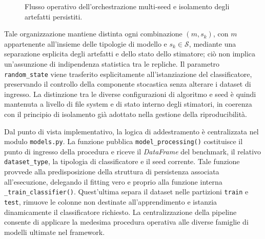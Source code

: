\begin{figure}[H]
\caption{Flusso operativo dell'orchestrazione multi-seed e isolamento degli artefatti persistiti.}
\label{fig:orchestrazione_training}
\end{figure}

Tale organizzazione mantiene distinta ogni combinazione $(m,s_k)$, con $m$ appartenente all'insieme delle tipologie di modello e $s_k \in \mathcal{S}$, mediante una separazione esplicita degli artefatti e dello stato dello stimatore; ciò non implica un'assunzione di indipendenza statistica tra le repliche. 
Il parametro \texttt{random\_state} viene trasferito esplicitamente all'istanziazione del classificatore, preservando il controllo della componente stocastica senza alterare i dataset di ingresso. 
La distinzione tra le diverse configurazioni di algoritmo e seed è quindi mantenuta a livello di file system e di stato interno degli stimatori, in coerenza con il principio di isolamento già adottato nella gestione della riproducibilità.

Dal punto di vista implementativo, la logica di addestramento è centralizzata nel modulo \texttt{models.py}. 
La funzione pubblica \texttt{model\_processing()} costituisce il punto di ingresso della procedura e riceve il \textit{DataFrame} del benchmark, il relativo \texttt{dataset\_type}, la tipologia di classificatore e il seed corrente. 
Tale funzione provvede alla predisposizione della struttura di persistenza associata all'esecuzione, delegando il fitting vero e proprio alla funzione interna \texttt{\_train\_classifier()}. 
Quest'ultima separa il dataset nelle partizioni \texttt{train} e \texttt{test}, rimuove le colonne non destinate all'apprendimento e istanzia dinamicamente il classificatore richiesto. 
La centralizzazione della pipeline consente di applicare la medesima procedura operativa alle diverse famiglie di modelli ultimate nel framework.


